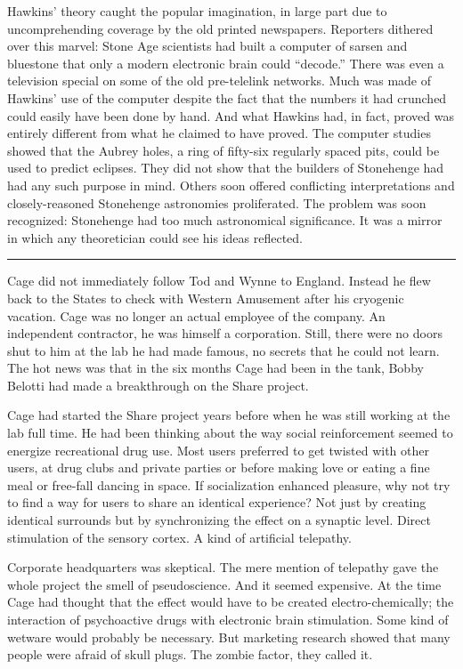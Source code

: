 Hawkins' theory caught the popular imagination, in large part due to uncomprehending coverage by the old printed newspapers. Reporters dithered over this marvel: Stone Age scientists had built a computer of sarsen and bluestone that only a modern electronic brain could ``decode.'' There was even a television special on some of the old pre-telelink networks. Much was made of Hawkins' use of the computer despite the fact that the numbers it had crunched could easily have been done by hand. And what Hawkins had, in fact, proved was entirely different from what he claimed to have proved. The computer studies showed that the Aubrey holes, a ring of fifty-six regularly spaced pits, could be used to predict eclipses. They did not show that the builders of Stonehenge had had any such purpose in mind. Others soon offered conflicting interpretations and closely-reasoned Stonehenge astronomies proliferated. The problem was soon recognized: Stonehenge had too much astronomical significance. It was a mirror in which any theoretician could see his ideas reflected.

\fancybreak{* * *}

Cage did not immediately follow Tod and Wynne to England. Instead he flew back to the States to check with Western Amusement after his cryogenic vacation. Cage was no longer an actual employee of the company. An independent contractor, he was himself a corporation. Still, there were no doors shut to him at the lab he had made famous, no secrets that he could not learn. The hot news was that in the six months Cage had been in the tank, Bobby Belotti had made a breakthrough on the Share project.

Cage had started the Share project years before when he was still working at the lab full time. He had been thinking about the way social reinforcement seemed to energize recreational drug use. Most users preferred to get twisted with other users, at drug clubs and private parties or before making love or eating a fine meal or free-fall dancing in space. If socialization enhanced pleasure, why not try to find a way for users to share an identical experience? Not just by creating identical surrounds but by synchronizing the effect on a synaptic level. Direct stimulation of the sensory cortex. A kind of artificial telepathy.

Corporate headquarters was skeptical. The mere mention of telepathy gave the whole project the smell of pseudoscience. And it seemed expensive. At the time Cage had thought that the effect would have to be created electro-chemically; the interaction of psychoactive drugs with electronic brain stimulation. Some kind of wetware would probably be necessary. But marketing research showed that many people were afraid of skull plugs. The zombie factor, they called it.

